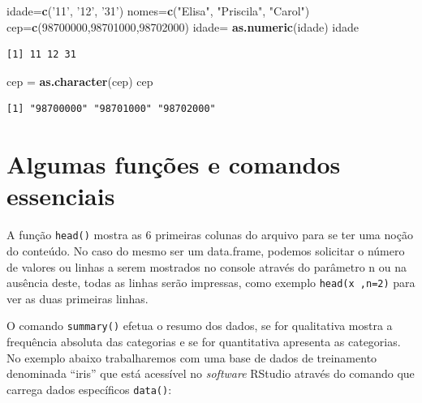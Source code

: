 \documentclass[12pt,portuguese,oneside]{book}
\newenvironment{Shaded}{\begin{snugshade}}{\end{snugshade}}
\newcommand{\KeywordTok}[1]{\textcolor[rgb]{0.13,0.29,0.53}{\textbf{#1}}}
\newcommand{\DecValTok}[1]{\textcolor[rgb]{0.00,0.00,0.81}{#1}}
\newcommand{\StringTok}[1]{\textcolor[rgb]{0.31,0.60,0.02}{#1}}
\newcommand{\NormalTok}[1]{#1}
\begin{document}
\begin{Shaded}
\begin{Highlighting}[]
\NormalTok{idade=}\KeywordTok{c}\NormalTok{(}\StringTok{'11'}\NormalTok{, }\StringTok{'12'}\NormalTok{, }\StringTok{'31'}\NormalTok{)}
\NormalTok{nomes=}\KeywordTok{c}\NormalTok{(}\StringTok{"Elisa"}\NormalTok{, }\StringTok{"Priscila"}\NormalTok{, }\StringTok{"Carol"}\NormalTok{)}
\NormalTok{cep=}\KeywordTok{c}\NormalTok{(}\DecValTok{98700000}\NormalTok{,}\DecValTok{98701000}\NormalTok{,}\DecValTok{98702000}\NormalTok{)}
\NormalTok{idade=}\StringTok{ }\KeywordTok{as.numeric}\NormalTok{(idade)}
\NormalTok{idade}
\end{Highlighting}
\end{Shaded}

\begin{verbatim}
[1] 11 12 31
\end{verbatim}

\begin{Shaded}
\begin{Highlighting}[]
\NormalTok{cep =}\StringTok{ }\KeywordTok{as.character}\NormalTok{(cep)}
\NormalTok{cep}
\end{Highlighting}
\end{Shaded}

\begin{verbatim}
[1] "98700000" "98701000" "98702000"
\end{verbatim}

\section{Algumas funções e comandos
essenciais}\label{algumas-funcoes-e-comandos-essenciais}

A função \texttt{head()} mostra as 6 primeiras colunas do arquivo para
se ter uma noção do conteúdo. No caso do mesmo ser um data.frame,
podemos solicitar o número de valores ou linhas a serem mostrados no
console através do parâmetro n ou na ausência deste, todas as linhas
serão impressas, como exemplo \texttt{head(x\ ,n=2)} para ver as duas
primeiras linhas.

O comando \texttt{summary()} efetua o resumo dos dados, se for
qualitativa mostra a frequência absoluta das categorias e se for
quantitativa apresenta as categorias. No exemplo abaixo trabalharemos
com uma base de dados de treinamento denominada ``iris'' que está
acessível no \emph{software} RStudio através do comando que carrega
dados específicos \texttt{data()}:
\end{document}
